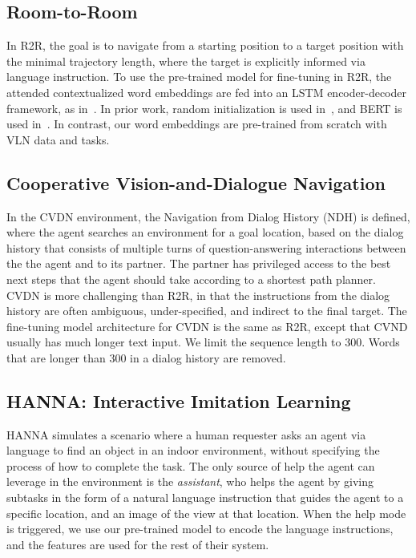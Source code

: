 \documentclass[10pt,twocolumn,letterpaper]{article}
\begin{document}
\subsection{Room-to-Room}
In R2R, the goal is to navigate from a starting position to a target position with the minimal trajectory length, where the target is explicitly informed via language instruction. To use the pre-trained model for fine-tuning in R2R, the attended contextualized word embeddings are fed into an LSTM encoder-decoder framework, as in~\cite{fried2018speaker,li2019robust}. In prior work, random initialization is used in~\cite{fried2018speaker}, and BERT is used in~\cite{li2019robust}. In contrast, our word embeddings are pre-trained from scratch with VLN data and tasks. 

\subsection{Cooperative Vision-and-Dialogue Navigation}
In the CVDN environment, the Navigation from Dialog History (NDH) is defined, where the agent searches an environment for a goal location, based on the dialog history that consists of multiple turns of question-answering interactions between the the agent and to its partner. The partner has privileged access to the best next steps that the agent should take according to a shortest path planner. CVDN is more challenging than R2R, in that the instructions from the dialog history are often ambiguous, under-specified, and indirect to the final target. The fine-tuning model architecture for CVDN is the same as R2R, except that CVND usually has much longer text input. We limit the sequence length to 300. Words that are longer than 300 in a dialog history are removed.

\subsection{HANNA: Interactive Imitation Learning} 
HANNA simulates a scenario where a human requester asks an agent via language to find an object in an indoor environment, without specifying the process of how to complete the task. The only source of help the agent can leverage in the environment is the {\em assistant}, who helps the agent by giving subtasks in the form of 
 a natural language instruction that guides the agent to a specific location, and 
 an image of the view at that location. When the help mode is triggered, we use our pre-trained model to encode the language instructions, and the features are used for the rest of their system.  
\end{document}
